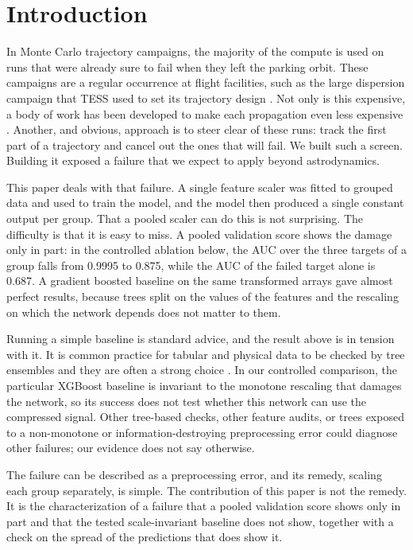 \documentclass[preprint,12pt,authoryear]{elsarticle}
\begin{document}
\section{Introduction}
\label{sec:intro}

In Monte Carlo trajectory campaigns, the majority of the compute is used on runs that were already sure to fail when they left the parking orbit. These campaigns are a regular occurrence at flight facilities, such as the large dispersion campaign that TESS used to set its trajectory design \citep{nickel2016}. Not only is this expensive, a body of work has been developed to make each propagation even less expensive \citep{massari2017,jia2022}. Another, and obvious, approach is to steer clear of these runs: track the first part of a trajectory and cancel out the ones that will fail. We built such a screen. Building it exposed a failure that we expect to apply beyond astrodynamics.

This paper deals with that failure. A single feature scaler was fitted to grouped data and used to train the model, and the model then produced a single constant output per group. That a pooled scaler can do this is not surprising. The difficulty is that it is easy to miss. A pooled validation score shows the damage only in part: in the controlled ablation below, the AUC over the three targets of a group falls from 0.9995 to 0.875, while the AUC of the failed target alone is 0.687. A gradient boosted baseline on the same transformed arrays gave almost perfect results, because trees split on the values of the features and the rescaling on which the network depends does not matter to them.

Running a simple baseline is standard advice, and the result above is in tension with it. It is common practice for tabular and physical data to be checked by tree ensembles and they are often a strong choice \citep{chen2016,grinsztajn2022,shwartz2022}. In our controlled comparison, the particular XGBoost baseline is invariant to the monotone rescaling that damages the network, so its success does not test whether this network can use the compressed signal. Other tree-based checks, other feature audits, or trees exposed to a non-monotone or information-destroying preprocessing error could diagnose other failures; our evidence does not say otherwise.

The failure can be described as a preprocessing error, and its remedy, scaling each group separately, is simple. The contribution of this paper is not the remedy. It is the characterization of a failure that a pooled validation score shows only in part and that the tested scale-invariant baseline does not show, together with a check on the spread of the predictions that does show it.
\end{document}
